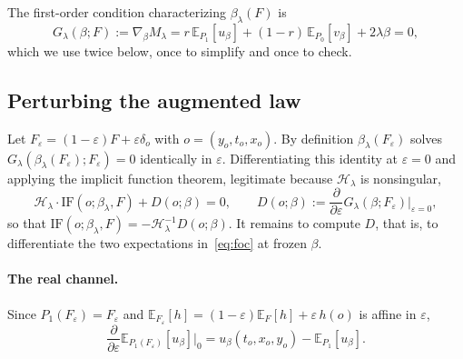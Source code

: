 \documentclass[11pt]{article}
\newcommand{\Eb}{\mathbb{E}}
\newcommand{\IF}{\mathrm{IF}}
\newcommand{\Hb}{\mathcal{H}}
\begin{document}
The first-order condition characterizing $\beta_\lambda(F)$ is
\begin{equation}
G_\lambda(\beta;F) := \nabla_\beta M_\lambda
= r\,\Eb_{P_1}[u_\beta] + (1-r)\,\Eb_{P_0}[v_\beta] + 2\lambda\beta = 0,
\label{eq:foc}
\end{equation}
which we use twice below, once to simplify and once to check.

\subsection{Perturbing the augmented law}
\label{sec:perturb}

Let $F_\varepsilon=(1-\varepsilon)F+\varepsilon\delta_o$ with $o=(y_o,t_o,x_o)$. By
definition $\beta_\lambda(F_\varepsilon)$ solves
$G_\lambda(\beta_\lambda(F_\varepsilon);F_\varepsilon)=0$ identically in $\varepsilon$.
Differentiating this identity at $\varepsilon=0$ and applying the implicit function
theorem, legitimate because $\Hb_\lambda$ is nonsingular,
\begin{equation}
\Hb_\lambda\cdot\IF(o;\beta_\lambda,F) + D(o;\beta) = 0,
\qquad
D(o;\beta):=\frac{\partial}{\partial\varepsilon}G_\lambda(\beta;F_\varepsilon)\Big|_{\varepsilon=0},
\label{eq:ift}
\end{equation}
so that $\IF(o;\beta_\lambda,F)=-\Hb_\lambda^{-1}D(o;\beta)$. It remains to compute
$D$, that is, to differentiate the two expectations in~\eqref{eq:foc} at frozen
$\beta$.

\paragraph{The real channel.}
Since $P_1(F_\varepsilon)=F_\varepsilon$ and
$\Eb_{F_\varepsilon}[h]=(1-\varepsilon)\Eb_F[h]+\varepsilon\,h(o)$ is affine in
$\varepsilon$,
\begin{equation}
\frac{\partial}{\partial\varepsilon}\Eb_{P_1(F_\varepsilon)}[u_\beta]\Big|_{0}
= u_\beta(t_o,x_o,y_o) - \Eb_{P_1}[u_\beta].
\label{eq:channel1}
\end{equation}
\end{document}
